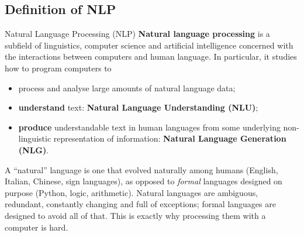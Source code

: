 \subsection{Definition of NLP}
\label{sec:nlp-definition}

\begin{nbdef}{Natural Language Processing (NLP)}
\textbf{Natural language processing} is a subfield of linguistics, computer science and
artificial intelligence concerned with the interactions between computers and human
language. In particular, it studies how to program computers to
\begin{itemize}[nosep]
  \item process and analyse large amounts of natural language data;
  \item \textbf{understand} text: \textbf{Natural Language Understanding (NLU)};
  \item \textbf{produce} understandable text in human languages from some underlying
        non-linguistic representation of information: \textbf{Natural Language
        Generation (NLG)}.
\end{itemize}
\end{nbdef}

A ``natural'' language is one that evolved naturally among humans (English, Italian,
Chinese, sign languages), as opposed to \emph{formal} languages designed on purpose
(Python, logic, arithmetic). Natural languages are ambiguous, redundant, constantly
changing and full of exceptions; formal languages are designed to avoid all of that.
This is exactly why processing them with a computer is hard.

\begin{center}
\end{center}
